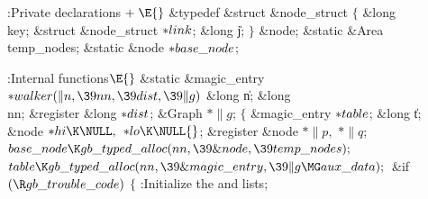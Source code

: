 \Y\B\4:Private declarations\X${}\mathrel+\E{}$\6
\&{typedef} \&{struct} \&{node\_struct} ${}\{{}$\1\6
\&{long} \\{key};\6
\&{struct} \&{node\_struct} ${}{*}\\{link}{}$;\6
\&{long} \|j;\2\6
${}\}{}$ \&{node};\6
\&{static} \&{Area} \\{temp\_nodes};\6
\&{static} \&{node} ${}{*}\\{base\_node}{}$;%
\par
\fi

\B{}:Internal functions\X${}\E{}$\6
\1\1\&{static} \&{magic\_entry} ${}{*}\\{walker}(\|n,\39\\{nn},\39\\{dist},\39%
\|g){}$\6
\&{long} \|n;\6
\&{long} \\{nn};\6
\&{register} \&{long} ${}{*}\\{dist}{}$;\6
\&{Graph} ${}{*}\|g{}$;%
\2\2\6
${}\{{}$\5
\1\&{magic\_entry} ${}{*}\\{table}{}$;\6
\&{long} \|t;\6
\&{node} ${}{*}\\{hi}\K\NULL,{}$ ${}{*}\\{lo}\K\NULL{}$;\6
\&{register} \&{node} ${}{*}\|p,{}$ ${}{*}\|q{}$;\7
${}\\{base\_node}\K\\{gb\_typed\_alloc}(\\{nn},\39\&{node},\39\\{temp%
\_nodes});{}$\6
${}\\{table}\K\\{gb\_typed\_alloc}(\\{nn},\39\&{magic\_entry},\39\|g\MG\\{aux%
\_data});{}$\6
\&{if} ${}(\R\\{gb\_trouble\_code}){}$\5
${}\{{}$\1\6
:Initialize the  and  lists\X;\6
